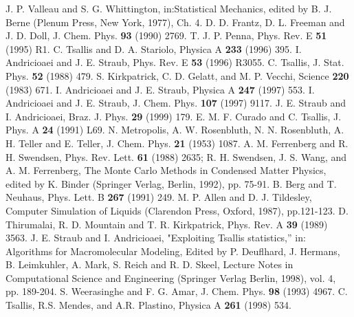 \begin{thebibliography}{16}

 J. P. Valleau and S. G. Whittington, in:Statistical Mechanics, 
edited by B. J. Berne (Plenum Press, New York, 1977), Ch. 4.
 D. D. Frantz, D. L. Freeman and J. D. Doll, J. Chem. Phys.
{\bf 93} (1990)
2769.
 T. J. P. Penna, Phys. Rev. E {\bf 51} (1995) R1. 
 C. Tsallis and D. A. Stariolo, Physica A {\bf 233} (1996) 395. 
 I. Andricioaei and J. E. Straub, Phys. Rev. E {\bf 53}
(1996) R3055.
 C. Tsallis, J. Stat. Phys. {\bf 52} (1988) 479. 
 S. Kirkpatrick, C. D. Gelatt, and M. P. Vecchi, Science {\bf
220} (1983) 671.
 I. Andricioaei and J. E. Straub, Physica A {\bf 247} (1997) 553.
 I. Andricioaei and J. E. Straub, J. Chem. Phys. {\bf 107}
(1997) 9117.
 J. E. Straub and I. Andricioaei, Braz. J. Phys. {\bf 29}
(1999) 179.
 E. M. F. Curado and C. Tsallis, J. Phys. A {\bf 24} (1991) L69.
 N. Metropolis, A. W. Rosenbluth, N. N. Rosenbluth, A. H. Teller
 and E. Teller, J. Chem. Phys. {\bf 21} (1953) 1087. 
 A. M. Ferrenberg and R. H. Swendsen, Phys. Rev. Lett. {\bf
61} (1988) 2635; R. H.
Swendsen, J. S. Wang, and A. M. Ferrenberg, The Monte Carlo Methods in
Condensed Matter
Physics, edited by K. Binder (Springer Verlag, Berlin, 1992), pp. 75-91.
 B. Berg and T. Neuhaus, Phys. Lett. B {\bf 267} (1991) 249.
 M. P. Allen and D. J. Tildesley, Computer Simulation of Liquids 
(Clarendon Press, Oxford, 1987), pp.121-123.
 D. Thirumalai, R. D. Mountain and T. R. Kirkpatrick, Phys.
Rev. A {\bf 39} (1989) 3563.
 J. E. Straub and I. Andricioaei, "Exploiting Tsallis
statistics,'' in: Algorithms for Macromolecular Modeling, Edited by P.
Deuflhard, J. Hermans, B. Leimkuhler, A. Mark, S. Reich and R. D. Skeel,
Lecture Notes in Computational Science and Engineering (Springer Verlag
Berlin, 1998), vol. 4, pp. 189-204. 
 S. Weerasinghe and F. G. Amar, J. Chem. Phys. {\bf 98} (1993)
4967.
 C. Tsallis, R.S. Mendes, and A.R. Plastino, Physica A {\bf
261} (1998) 534.
\end{thebibliography}

\newpage


